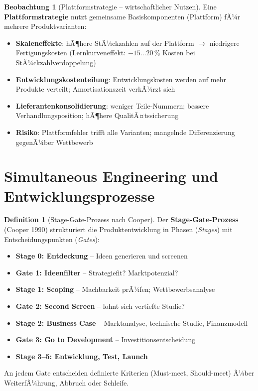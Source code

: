 ﻿\documentclass[a4paper,12pt]{report}
\theoremstyle{definition}
\newtheorem{definition}{Definition}
\newtheorem{beobachtung}{Beobachtung}
\begin{document}
\begin{beobachtung}[Plattformstrategie -- wirtschaftlicher Nutzen]
Eine \textbf{Plattformstrategie} nutzt gemeinsame Basiskomponenten
(Plattform) fÃ¼r mehrere Produktvarianten:
\begin{itemize}
    \item[-] \textbf{Skaleneffekte}: hÃ¶here StÃ¼ckzahlen auf der Plattform
          $\to$ niedrigere Fertigungskosten (Lernkurveneffekt:
          $-15\ldots20\,\%$ Kosten bei StÃ¼ckzahlverdoppelung)
    \item[-] \textbf{Entwicklungskostenteilung}: Entwicklungskosten werden
          auf mehr Produkte verteilt; Amortisationszeit verkÃ¼rzt sich
    \item[-] \textbf{Lieferantenkonsolidierung}: weniger Teile-Nummern;
          bessere Verhandlungsposition; hÃ¶here QualitÃ¤tssicherung
    \item[-] \textbf{Risiko}: Plattformfehler trifft alle Varianten;
          mangelnde Differenzierung gegenÃ¼ber Wettbewerb
\end{itemize}
\end{beobachtung}

\section{Simultaneous Engineering und Entwicklungsprozesse}

\begin{definition}[Stage-Gate-Prozess nach Cooper]
Der \textbf{Stage-Gate-Prozess} (Cooper 1990) strukturiert die Produktentwicklung
in Phasen (\emph{Stages}) mit Entscheidungspunkten (\emph{Gates}):
\begin{itemize}
    \item[-] \textbf{Stage 0: Entdeckung} -- Ideen generieren und screenen
    \item[-] \textbf{Gate 1: Ideenfilter} -- Strategiefit? Marktpotenzial?
    \item[-] \textbf{Stage 1: Scoping} -- Machbarkeit prÃ¼fen; Wettbewerbsanalyse
    \item[-] \textbf{Gate 2: Second Screen} -- lohnt sich vertiefte Studie?
    \item[-] \textbf{Stage 2: Business Case} -- Marktanalyse, technische Studie, Finanzmodell
    \item[-] \textbf{Gate 3: Go to Development} -- Investitionsentscheidung
    \item[-] \textbf{Stage 3--5: Entwicklung, Test, Launch}
\end{itemize}
An jedem Gate entscheiden definierte Kriterien (Must-meet, Should-meet)
Ã¼ber WeiterfÃ¼hrung, Abbruch oder Schleife.
\end{definition}
\end{document}
